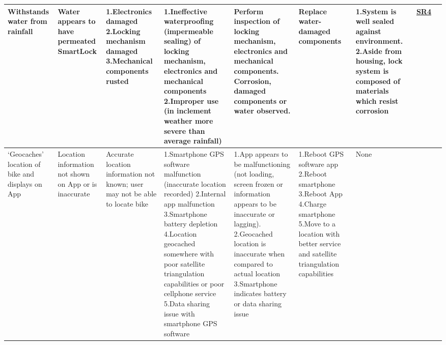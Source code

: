 \documentclass{article}
\begin{document}
\begin{table}[H]
\begin{tabular}{| p{} | p{}  | p{} | p{} | p{} | p{} | p{} | p{} | p{} |}
Withstands water from rainfall & Water appears to have permeated SmartLock & 1.Electronics damaged \newline 2.Locking mechanism damaged \newline 3.Mechanical components rusted & 1.Ineffective waterproofing (impermeable sealing) of locking mechanism, electronics and mechanical components \newline 2.Improper use (in inclement weather more severe than average rainfall) & Perform inspection of locking mechanism, electronics and mechanical components. Corrosion, damaged components or water observed. & Replace water-damaged components & 1.System is well sealed against environment. \newline 2.Aside from housing, lock system is composed of materials which resist corrosion & \hyperref[SR4]{SR4} &  \\ \hline

‘Geocaches’ location of bike and displays on App & Location information not shown on App or is inaccurate & Accurate location information not known; user may not be able to locate bike & 1.Smartphone GPS software malfunction (inaccurate location recorded) \newline 2.Internal app malfunction  \newline 3.Smartphone battery depletion \newline 4.Location geocached somewhere with poor satellite triangulation capabilities or poor cellphone service \newline 5.Data sharing issue with smartphone GPS software & 1.App appears to be malfunctioning (not loading, screen frozen or information appears to be inaccurate or lagging).  \newline 2.Geocached location is inaccurate when compared to actual location \newline 3.Smartphone indicates battery or data sharing issue & 1.Reboot GPS software app \newline 2.Reboot smartphone \newline 3.Reboot App \newline 4.Charge smartphone \newline 5.Move to a location with better service and satellite triangulation capabilities & None &  &  \\ \hline


\end{tabular}
\end{table}
\end{document}

